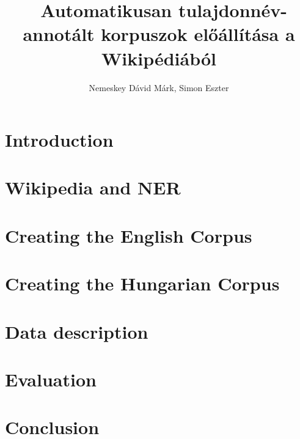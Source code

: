 \documentclass{llncs}
\begin{document}
\pagestyle{myheadings}
\def\leftmark{{\rm IX. Magyar Sz\'am\'\i t\'og\'epes Nyelv\'eszeti Konferencia}}
\def\rightmark{{\rm Szeged, 2013. január 7-8.}}

\setcounter{page}{3}

\title{\ \break Automatikusan tulajdonnév-annotált korpuszok előállítása a Wikipédiából}
\author{Nemeskey Dávid Márk, Simon Eszter}

\maketitle

\section{Introduction}

\section{Wikipedia and NER}

\section{Creating the English Corpus}

\section{Creating the Hungarian Corpus}

\section{Data description}

\section{Evaluation}

\section{Conclusion}
\end{document}
